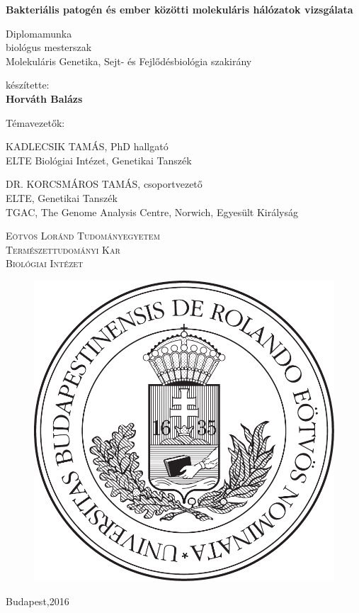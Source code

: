\documentclass[a4paper,12pt]{article}
\newcommand{\thesistitle}[1]{

	\vspace{48pt}
	\textbf{\noindent \huge {#1}}
	\vspace{24pt}

}
\newcommand{\spec}[1]{

		\Large Diplomamunka \\
		\large biológus mesterszak \\
		\large {#1} szakirány
		\vspace{48pt}
}
\newcommand{\name}[1]{
	\large{készítette:} \\
	\Large\textbf{{#1}}
	\vspace{84pt}
	

}
\newcommand{\consulent}[3]{
	\large{#1}, {#2} \\
	\large{{#3}}
}
\newcommand{\footer}[1]{

	\textsc{Eötvös Loránd Tudományegyetem}\\
	\textsc{Természettudományi Kar}\\
	\textsc{Biológiai Intézet} \\
	
	\begin{figure}[H]
		\centering
		\includegraphics[scale=0.35]{img/elte_cimer_vector.pdf}
	\end{figure}
	
	Budapest,#1


}
\begin{document}
	\thispagestyle{empty}
	
	\begin{center}
			\thesistitle{Bakteriális patogén és ember közötti molekuláris hálózatok vizsgálata}
			
			\spec{Molekuláris Genetika, Sejt- és Fejlődésbiológia}
			
			\name{Horváth Balázs}
			
			\large Témavezetők:
			\vspace{0.21cm}
			
			\consulent{KADLECSIK TAMÁS}{PhD hallgató}{ELTE Biológiai Intézet, Genetikai Tanszék}
			
			\vspace{16pt}
			
			\consulent{DR. KORCSMÁROS TAMÁS}{csoportvezető}{ELTE, Genetikai Tanszék} \\
			\large TGAC, The Genome Analysis Centre, Norwich, Egyesült Királyság
			
			\vspace{38pt}
			
			\footer{2016}
			
	\end{center}

	
\end{document}
